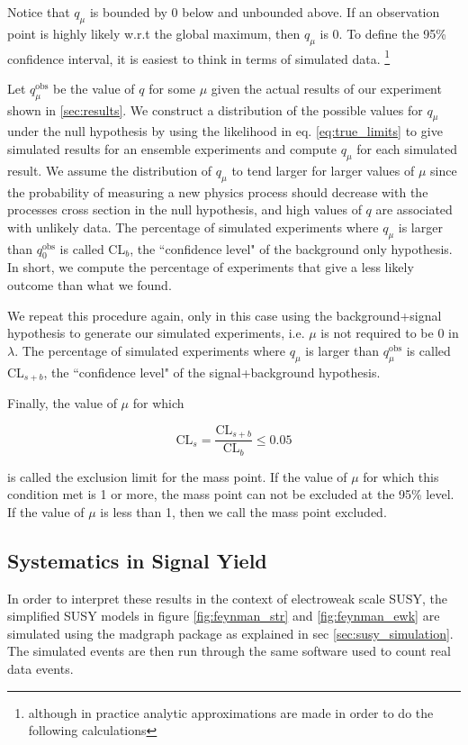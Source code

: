        Notice that $q_\mu$ is bounded by 0 below and unbounded above. If an observation point is highly likely w.r.t the global maximum, then $q_\mu$ is 0. To define the 95\% confidence interval, it is easiest to think in terms of simulated data. \footnote{ although in practice analytic approximations are made in order to do the following calculations} 

       Let $q^\text{obs}_\mu$ be the value of $q$ for some $\mu$ given the actual results of our experiment shown in \ref{sec:results}. We construct a distribution of the possible values for $q_\mu$ under the null hypothesis by using the likelihood in eq. \ref{eq:true_limits} to give simulated results for an ensemble experiments and compute $q_\mu$ for each simulated result. We assume the distribution of $q_\mu$ to tend larger for larger values of $\mu$ since the probability of measuring a new physics process should decrease with the processes cross section in the null hypothesis, and high values of $q$ are associated with unlikely data. The percentage of simulated experiments where $q_\mu$ is larger than $q^\text{obs}_0$ is called CL$_b$, the ``confidence level" of the background only hypothesis. In short, we compute the percentage of experiments that give a less likely outcome than what we found. 

       We repeat this procedure again, only in this case using the background+signal hypothesis to generate our simulated experiments, i.e. $\mu$ is not required to be 0 in $\lambda$. The percentage of simulated experiments where $q_\mu$ is larger than $q^\text{obs}_\mu$ is called CL$_{s+b}$, the ``confidence level" of the signal+background hypothesis. 

       Finally, the value of $\mu$ for which 

       \[
        \text{CL}_s = \frac{\text{CL}_{s+b}}{\text{CL}_b} \le 0.05
       \]

       is called the exclusion limit for the mass point. If the value of $\mu$ for which this condition met is 1 or more, the mass point can not be excluded at the 95\% level. If the value of $\mu$ is less than 1, then we call the mass point excluded.


  \subsection{Systematics in Signal Yield} \label{sec:systematics_in_signal_yield}
    In order to interpret these results in the context of electroweak scale SUSY, the simplified SUSY models in figure \ref{fig:feynman_str} and \ref{fig:feynman_ewk} are simulated using the madgraph package as explained in sec \ref{sec:susy_simulation}. The simulated events are then run through the same software used to count real data events. 

